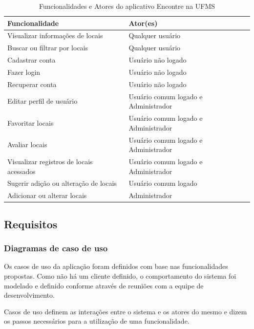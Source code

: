     \begin{table}[h]
        \begin{tabularx}{\textwidth}{|X|X|}
            \hline
            \textbf{Funcionalidade} & \textbf{Ator(es)} \\ \hline
            Visualizar informações de locais & Qualquer usuário \\ \hline
            Buscar ou filtrar por locais & Qualquer usuário \\ \hline
            Cadastrar conta & Usuário não logado \\ \hline
            Fazer login & Usuário não logado \\ \hline
            Recuperar conta & Usuário não logado \\ \hline
            Editar perfil de usuário & Usuário comum logado e Administrador \\ \hline
            Favoritar locais & Usuário comum logado e Administrador \\ \hline
            Avaliar locais & Usuário comum logado e Administrador \\ \hline
            Visualizar registros de locais acessados & Usuário comum logado e Administrador \\ \hline
            Sugerir adição ou alteração de locais & Usuário comum logado \\ \hline
            Adicionar ou alterar locais & Administrador \\ \hline
        \end{tabularx}
        \caption{Funcionalidades e Atores do aplicativo Encontre na UFMS}
        \label{tab:funcionalidades-atores}
    \end{table}
    \FloatBarrier
\subsection{Requisitos}
\subsubsection{Diagramas de caso de uso}

    Os casos de uso da aplicação foram definidos com base nas funcionalidades propostas. Como não há um cliente definido, o comportamento do sistema foi modelado e definido conforme através de reuniões com a equipe de desenvolvimento.

    Casos de uso definem as interações entre o sistema e os atores do mesmo e dizem os passos necessários para a utilização de uma funcionalidade.


